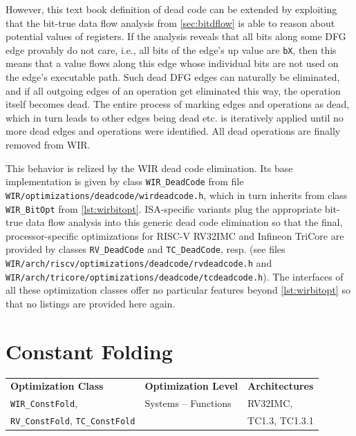 However, this text book definition of dead code can be extended by exploiting that the bit-true data flow analysis from \cref{sec:bitdflow} is able to reason about potential values of registers.
If the analysis reveals that all bits along some \gls{DFG} edge provably do not care, i.e., all bits of the edge's up value are \texttt{bX}, then this means that a value flows along this edge whose individual bits are not used on the edge's executable path.
Such dead \gls{DFG} edges can naturally be eliminated, and if all outgoing edges of an operation get eliminated this way, the operation itself becomes dead.
The entire process of marking edges and operations as dead, which in turn leads to other edges being dead etc. is iteratively applied until no more dead edges and operations were identified.
All dead operations are finally removed from \gls{WIR}.

This behavior is relized by the \gls{WIR} dead code elimination.
Its base implementation is given by class \texttt{WIR\_Dead\-Code} from file \texttt{WIR/optimizations/deadcode/wirdeadcode.h}, which in turn inherits from class \texttt{WIR\_BitOpt} from \cref{lst:wirbitopt}.
\gls{ISA}-specific variants plug the appropriate bit-true data flow analysis into this generic dead code elimination so that the final, processor-specific optimizations for RISC-V RV32IMC and Infineon TriCore are provided by classes \texttt{RV\_DeadCode} and \texttt{TC\_DeadCode}, resp. (see files \texttt{WIR/arch/riscv/optimizations/dead\-code/rvdeadcode.h} and \texttt{WIR/arch/tricore/optimizations/deadcode/tcdeadcode.h}).
The interfaces of all these optimization classes offer no particular features beyond \cref{lst:wirbitopt} so that no listings are provided here again.


\section{Constant Folding}
\label{sec:optcfold}

\begin{tabular}{|l|l|l|}
  \hline
  \textbf{Optimization Class} & \textbf{Optimization Level} & \textbf{Architectures} \\
  \hhline{|=|=|=|}
  \texttt{WIR\_ConstFold}, & Systems -- Functions & RV32IMC, \\
  \texttt{RV\_ConstFold}, \texttt{TC\_ConstFold} & & TC1.3, TC1.3.1 \\
  \hline
\end{tabular}

